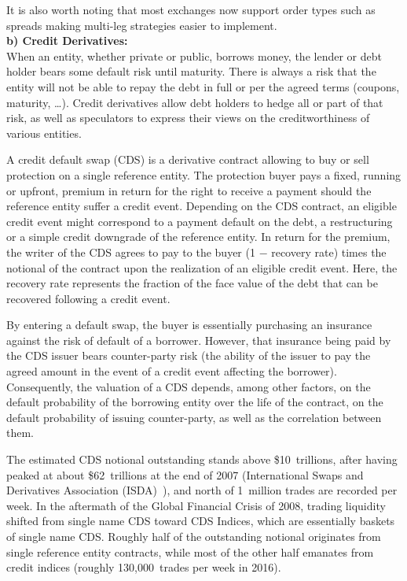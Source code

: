 It is also worth noting that most exchanges now support order types such as spreads making multi-leg strategies easier to implement. \\

\noindent\textbf{b) Credit Derivatives:} \\

When an entity, whether private or public, borrows money, the lender or debt holder bears some default risk until maturity. There is always a risk that the entity will not be able to repay the debt in full or per the agreed terms (coupons, maturity, \dots). Credit derivatives allow debt holders to hedge all or part of that risk, as well as speculators to express their views on the creditworthiness of various entities. 


A credit default swap (CDS) is a derivative contract allowing to buy or sell protection on a single reference entity. The protection buyer pays a fixed, running or upfront, premium in return for the right to receive a payment should the reference entity suffer a credit event. Depending on the CDS contract, an eligible credit event might correspond to a payment default on the debt, a restructuring or a simple credit downgrade of the reference entity. In return for the premium, the writer of the CDS agrees to pay to the buyer (1 $-$ recovery rate) times the notional of the contract upon the realization of an eligible credit event. Here, the recovery rate represents the fraction of the face value of the debt that can be recovered following a credit event.


By entering a default swap, the buyer is essentially purchasing an insurance against the risk of default of a borrower. However, that insurance being paid by the CDS issuer bears counter-party risk (the ability of the issuer to pay the agreed amount in the event of a credit event affecting the borrower). Consequently, the valuation of a CDS depends, among other factors, on the default probability of the borrowing entity over the life of the contract, on the default probability of issuing counter-party, as well as the correlation between them.


The estimated CDS notional outstanding stands above \$10~trillions, after having peaked at about \$62~trillions at the end of 2007 (International Swaps and Derivatives Association (ISDA)~\cite{ISDA}), and north of 1~million trades are recorded per week. In the aftermath of the Global Financial Crisis of 2008, trading liquidity shifted from single name CDS toward CDS Indices, which are essentially baskets of single name CDS. Roughly half of the outstanding notional originates from single reference entity contracts, while most of the other half emanates from credit indices (roughly 130,000~trades per week in 2016).



